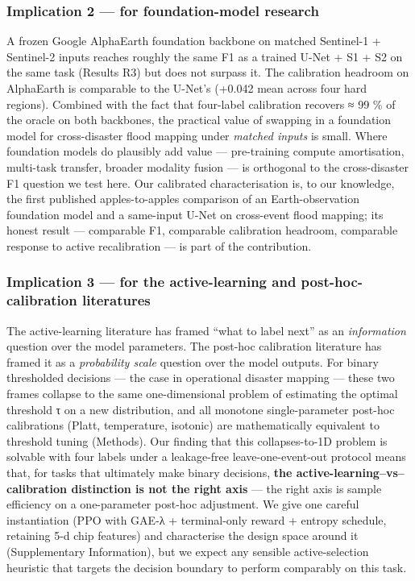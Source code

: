 \subsubsection{Implication 2 --- for foundation-model research}\label{implication-2-for-foundation-model-research}

A frozen Google AlphaEarth foundation backbone on matched Sentinel-1 +
Sentinel-2 inputs reaches roughly the same F1 as a trained U-Net + S1 +
S2 on the same task (Results R3) but does not surpass it. The
calibration headroom on AlphaEarth is comparable to the U-Net's
(+0.042 mean across four hard regions). Combined with the fact that
four-label calibration recovers ≈ 99 \% of the oracle on both backbones,
the practical value of
swapping in a foundation model for cross-disaster flood mapping under
\emph{matched inputs} is small. Where foundation models do plausibly add
value --- pre-training compute amortisation, multi-task transfer, broader
modality fusion --- is orthogonal to the cross-disaster F1 question we
test here. Our calibrated characterisation is, to our knowledge, the
first published apples-to-apples comparison of an Earth-observation
foundation model and a same-input U-Net on cross-event flood mapping;
its honest result --- comparable F1, comparable calibration headroom,
comparable response to active recalibration --- is part of the
contribution.

\subsubsection{Implication 3 --- for the active-learning and post-hoc-calibration literatures}\label{implication-3-for-the-active-learning-and-post-hoc-calibration-literatures}

The active-learning literature has framed ``what to label next'' as an
\emph{information} question over the model parameters. The post-hoc
calibration literature has framed it as a \emph{probability scale} question
over the model outputs. For binary thresholded decisions --- the case in
operational disaster mapping --- these two frames collapse to the same
one-dimensional problem of estimating the optimal threshold τ on a new
distribution, and all monotone single-parameter post-hoc calibrations
(Platt, temperature, isotonic) are mathematically equivalent to
threshold tuning (Methods). Our finding that this collapses-to-1D
problem is solvable with four labels under a leakage-free
leave-one-event-out protocol means that, for tasks that ultimately make
binary decisions, \textbf{the active-learning--vs--calibration distinction is
not the right axis} --- the right axis is sample efficiency on a
one-parameter post-hoc adjustment. We give one careful instantiation
(PPO with GAE-λ + terminal-only reward + entropy schedule, retaining
5-d chip features) and characterise the design space around it
(Supplementary Information), but we expect any sensible active-selection
heuristic that targets the decision boundary to perform comparably on
this task.

